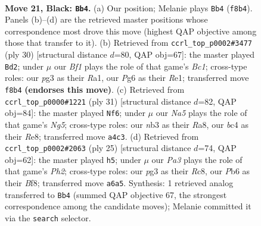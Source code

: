 \documentclass[11pt]{article}
\begin{document}
\clearpage

\begin{figure}[p]\centering
\begin{subfigure}{0.46\textwidth}\centering
\resizebox{\linewidth}{!}{%
\newchessgame
\chessboard[
  setfen={r1b2b1r/5k1p/ppn1p1p1/4Pp2/n1B2B2/1N3NP1/PP3P1P/RK4R1 b - - 3 21},
  showmover=false,
  pgfstyle=straightmove, color=movearrow, markmove={f8-b4}
]}
\caption{}
\end{subfigure}\hfill
\begin{subfigure}{0.46\textwidth}\centering
\resizebox{\linewidth}{!}{%
\newchessgame
\chessboard[
  setfen={rn3rk1/1p1bppbp/5np1/1p1P4/7N/2N3P1/PP3PBP/R1B1R1K1 w - - 0 16},
  showmover=false,
  pgfstyle=straightmove, color=movearrow, markmove={c1-d2}
]}
\caption{}
\end{subfigure}
\\[4pt]
\begin{subfigure}{0.46\textwidth}\centering
\resizebox{\linewidth}{!}{%
\newchessgame
\chessboard[
  setfen={r1b1r1k1/1p3p1p/pn1p2p1/2pP4/5Bn1/2P2NP1/P3PPBP/R3R1K1 b - - 0 16},
  showmover=false,
  pgfstyle=straightmove, color=movearrow, markmove={g4-f6}
]}
\caption{}
\end{subfigure}\hfill
\begin{subfigure}{0.46\textwidth}\centering
\resizebox{\linewidth}{!}{%
\newchessgame
\chessboard[
  setfen={2r1kbnr/1b1p1ppp/p3p3/1p6/3BPP2/2NB4/PPP3PP/1K1RR3 b k - 0 13},
  showmover=false,
  pgfstyle=straightmove, color=movearrow, markmove={h7-h5}
]}
\caption{}
\end{subfigure}
\caption{\textbf{Move 21, Black: \texttt{Bb4}.} (a) Our position; Melanie plays \texttt{Bb4} (\texttt{f8b4}). Panels (b)--(d) are the retrieved master positions whose correspondence most drove this move (highest QAP objective among those that transfer to it). (b) Retrieved from \texttt{ccrl\_top\_p0002\#3477} (ply 30) [structural distance $d$=80, QAP obj=67]: the master played \texttt{Bd2}; under $\mu$ our \emph{Bf1} plays the role of that game's \emph{Bc1}; cross-type roles: our \emph{p}g3 as their \emph{R}a1, our \emph{P}g6 as their \emph{R}e1; transferred move \texttt{f8b4} \textbf{(endorses this move)}. (c) Retrieved from \texttt{ccrl\_top\_p0000\#1221} (ply 31) [structural distance $d$=82, QAP obj=84]: the master played \texttt{Nf6}; under $\mu$ our \emph{Na5} plays the role of that game's \emph{Ng5}; cross-type roles: our \emph{n}b3 as their \emph{R}a8, our \emph{b}c4 as their \emph{R}e8; transferred move \texttt{a4c3}. (d) Retrieved from \texttt{ccrl\_top\_p0002\#2063} (ply 25) [structural distance $d$=74, QAP obj=62]: the master played \texttt{h5}; under $\mu$ our \emph{Pa3} plays the role of that game's \emph{Ph2}; cross-type roles: our \emph{p}g3 as their \emph{R}c8, our \emph{P}b6 as their \emph{B}f8; transferred move \texttt{a6a5}. Synthesis: 1 retrieved analog transferred to \texttt{Bb4} (summed QAP objective 67, the strongest correspondence among the candidate moves); Melanie committed it via the \texttt{search} selector.}
\label{fig:thought-m41}
\end{figure}
\end{document}
